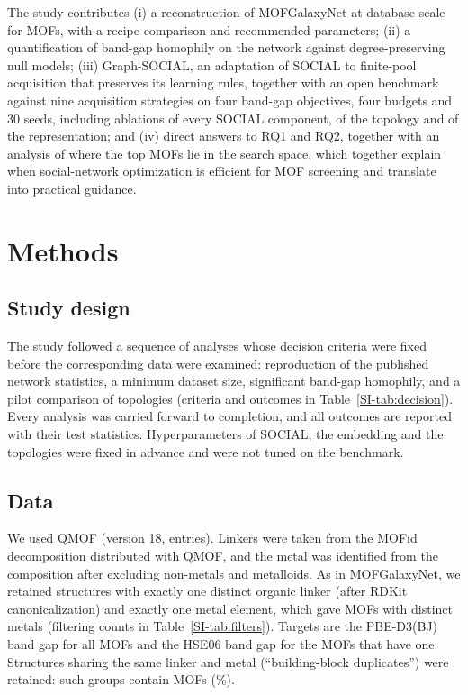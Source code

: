 \documentclass[journal=jcisd8,manuscript=article]{achemso}
\newcommand{\gs}{Graph-SOCIAL}
\begin{document}
The study contributes (i) a reconstruction of MOFGalaxyNet at database scale for \nPool{} MOFs, with a recipe comparison and recommended parameters; (ii) a quantification of band-gap homophily on the network against degree-preserving null models; (iii) \gs{}, an adaptation of SOCIAL to finite-pool acquisition that preserves its learning rules, together with an open benchmark against nine acquisition strategies on four band-gap objectives, four budgets and 30 seeds, including ablations of every SOCIAL component, of the topology and of the representation; and (iv) direct answers to RQ1 and RQ2, together with an analysis of where the top MOFs lie in the search space, which together explain when social-network optimization is efficient for MOF screening and translate into practical guidance.

\section{Methods}

\subsection{Study design}
The study followed a sequence of analyses whose decision criteria were fixed before the corresponding data were examined: reproduction of the published network statistics, a minimum dataset size, significant band-gap homophily, and a pilot comparison of topologies (criteria and outcomes in Table~\ref{SI-tab:decision}). Every analysis was carried forward to completion, and all outcomes are reported with their test statistics. Hyperparameters of SOCIAL, the embedding and the topologies were fixed in advance and were not tuned on the benchmark.

\subsection{Data}
We used QMOF\cite{rosen2021qmof,rosen2022qmof} (version 18, \nQmofAll{} entries). Linkers were taken from the MOFid decomposition\cite{bucior2019mofid} distributed with QMOF, and the metal was identified from the composition after excluding non-metals and metalloids. As in MOFGalaxyNet, we retained structures with exactly one distinct organic linker (after RDKit\cite{rdkit} canonicalization) and exactly one metal element, which gave \nPool{} MOFs with \nMetals{} distinct metals (filtering counts in Table~\ref{SI-tab:filters}). Targets are the PBE-D3(BJ) band gap\cite{perdew1996pbe} for all MOFs and the HSE06 band gap\cite{heyd2003hse} for the \nHse{} MOFs that have one. Structures sharing the same linker and metal (``building-block duplicates'') were retained: \nDupGroups{} such groups contain \nDupMofs{} MOFs (\pctDupMofs\%).
\end{document}
